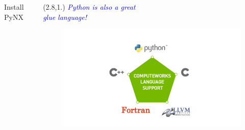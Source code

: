 \documentclass[]{beamer}
\begin{document}
\begin{frame}[fragile]
\begin{columns}
\begin{column}{.7\textwidth}
\begin{block}{Install PyNX}
\begin{itemize}
\end{itemize}
        \end{block}
        \vspace*{-0.31cm}
    \end{column}
    \begin{column}{.3\textwidth}
        \begin{textblock}{5}(2.8,1.)
                \scriptsize\itshape{\textcolor{blue}{Python is also a great\\ glue language!}}
            \end{textblock}
        \begin{figure}
            \begin{minipage}{0.65\textwidth}
                \includegraphics[width=2.4\textwidth]
                {pics/cuda-5}
            \end{minipage}
        \end{figure}   
    \end{column}
    \hspace*{1.cm}
\end{columns}
\end{frame}
\end{document}
